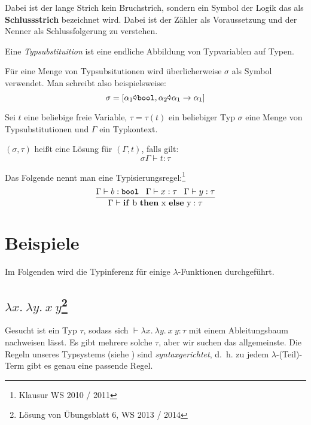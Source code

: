 Dabei ist der lange Strich kein Bruchstrich, sondern ein Symbol der Logik das als
\textbf{Schlussstrich} bezeichnet wird. Dabei ist der 
Zähler als Voraussetzung und der Nenner als Schlussfolgerung zu verstehen.

\begin{definition}[Typsubstituition]%
	Eine \textit{Typsubstituition} ist eine endliche Abbildung von Typvariablen auf
	Typen.
\end{definition}

Für eine Menge von Typsubsitutionen wird überlicherweise $\sigma$ als Symbol
verwendet. Man schreibt also beispielsweise:
\[\sigma = [\alpha_1 \text{\pointer} \text{\texttt{bool}}, \alpha_2 \text{\pointer} \alpha_1 \rightarrow \alpha_1]\]

\begin{definition}
	Sei $t$ eine beliebige freie Variable, $\tau = \tau(t)$ ein beliebiger Typ
	$\sigma$ eine Menge von Typsubstitutionen und $\Gamma$ ein Typkontext.

	$(\sigma, \tau)$ heißt eine Lösung für $(\Gamma, t)$, falls gilt:
	\[\sigma \Gamma \vdash t : \tau\]
\end{definition}

\begin{beispiel}[Typisierungsregel]%
	Das Folgende nennt man eine Typisierungsregel:\footnote{Klausur WS 2010 / 2011}
	\[\frac{\Gamma \vdash b: \text{\texttt{bool}}\;\;\; \Gamma \vdash x: \tau \;\;\; \Gamma \vdash y: \tau }{\Gamma \vdash \text{\textbf{if} b \textbf{then} x \textbf{else} y} : \tau}\]
\end{beispiel}

\section{Beispiele}
Im Folgenden wird die Typinferenz für einige $\lambda$-Funktionen durchgeführt.

\subsection[$\lambda x.\ \lambda y.\ x\ y$]{$\lambda x.\ \lambda y.\ x\ y$\footnote{Lösung von Übungsblatt 6, WS 2013 / 2014}}
Gesucht ist ein Typ $\tau$, sodass sich $\vdash \lambda x.\ \lambda y.\ x\ y: \tau$
mit einem Ableitungsbaum nachweisen lässt. Es gibt mehrere solche $\tau$, aber
wir suchen das allgemeinste. Die Regeln unseres Typsystems (siehe ) 
sind \textit{syntaxgerichtet}, d.~h. zu jedem $\lambda$-(Teil)-Term gibt es genau
eine passende Regel.

